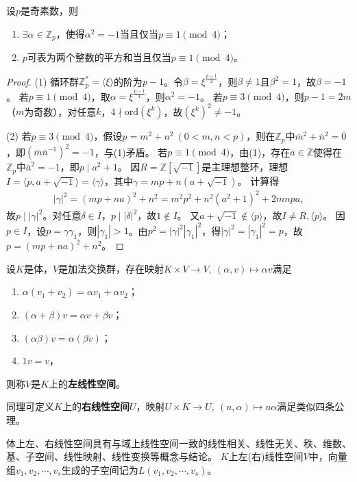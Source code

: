 \documentclass[../../main.tex]{subfiles}%
\begin{document}
\begin{example}
设$p$是奇素数，则
\begin{enumerate}[(1)]
\item $\exists\alpha\in\mathbb{Z}_p$，使得$\alpha^2=-1$当且仅当$p\equiv1\pmod{4}$；
\item $p$可表为两个整数的平方和当且仅当$p\equiv1\pmod{4}$。
\end{enumerate}
\end{example}
\begin{proof}

(1) 循环群$\mathbb{Z}_p^*=\langle\xi\rangle$的阶为$p-1$。令$\beta=\xi^{\frac{p-1}{2}}$，则$\beta\neq1$且$\beta^2=1$，故$\beta=-1$。
若$p\equiv1\pmod{4}$，取$\alpha=\xi^{\frac{p-1}{4}}$，则$\alpha^2=-1$。
若$p\equiv3\pmod{4}$，则$p-1=2m$（$m$为奇数），对任意$k$，$4\nmid\mathrm{ord}(\xi^k)$，故$(\xi^k)^2\neq-1$。

(2) 若$p\equiv3\pmod{4}$，假设$p=m^2+n^2\ (0<m,n<p)$，则在$\mathbb{Z}_p$中$\overline{m}^2+\overline{n}^2=\overline{0}$，即$(\overline{m}\overline{n}^{-1})^2=-1$，与(1)矛盾。
若$p\equiv1\pmod{4}$，由(1)，存在$a\in\mathbb{Z}$使得在$\mathbb{Z}_p$中$\overline{a}^2=-1$，即$p\mid a^2+1$。
因$R=\mathbb{Z}[\sqrt{-1}]$是主理想整环，理想$I=\langle p,a+\sqrt{-1}\rangle=\langle\gamma\rangle$，其中$\gamma=mp+n(a+\sqrt{-1})$。
计算得
\begin{align*}
|\gamma|^2=(mp+na)^2+n^2=m^2p^2+n^2(a^2+1)^2+2mnpa,
\end{align*}
故$p\mid|\gamma|^2$。对任意$\delta\in I$，$p\mid|\delta|^2$，故$1\notin I$。
又$a+\sqrt{-1}\notin\langle p\rangle$，故$I\neq R,\langle p\rangle$。
因$p\in I$，设$p=\gamma\gamma_1$，则$|\gamma_1|>1$。由$p^2=|\gamma|^2|\gamma_1|^2$，得$|\gamma|^2=|\gamma_1|^2=p$，故$p=(mp+na)^2+n^2$。

\end{proof}

\begin{definition}
设$K$是体，$V$是加法交换群，存在映射$K\times V\to V,\ (\alpha,v)\mapsto\alpha v$满足
\begin{enumerate}[(1)]
\item $\alpha(v_1+v_2)=\alpha v_1+\alpha v_2$；
\item $(\alpha+\beta)v=\alpha v+\beta v$；
\item $(\alpha\beta)v=\alpha(\beta v)$；
\item $1v=v$，
\end{enumerate}
则称$V$是$K$上的\textbf{左线性空间}。

同理可定义$K$上的\textbf{右线性空间}$U$，映射$U\times K\to U,\ (u,\alpha)\mapsto u\alpha$满足类似四条公理。
\end{definition}
\begin{remark}
体上左、右线性空间具有与域上线性空间一致的线性相关、线性无关、秩、维数、基、子空间、线性映射、线性变换等概念与结论。
$K$上左(右)线性空间$V$中，向量组$v_1,v_2,\cdots,v_s$生成的子空间记为$L(v_1,v_2,\cdots,v_s)$。
\end{remark}
\end{document}
